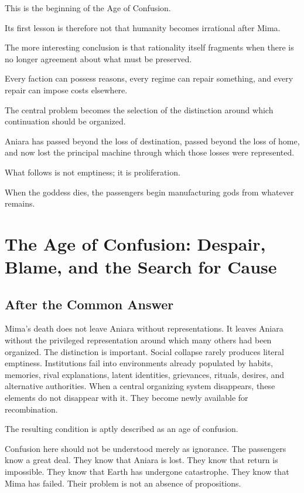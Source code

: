 \documentclass[11pt,oneside]{book}
\theoremstyle{definition}
\theoremstyle{remark}
\begin{document}
This is the beginning of the Age of Confusion.

Its first lesson is therefore not that humanity becomes irrational after Mima.

The more interesting conclusion is that rationality itself fragments when there is no longer agreement about what must be preserved.

Every faction can possess reasons, every regime can repair something, and every repair can impose costs elsewhere.

The central problem becomes the selection of the distinction around which continuation should be organized.

Aniara has passed beyond the loss of destination, passed beyond the loss of home, and now lost the principal machine through which those losses were represented.

What follows is not emptiness; it is proliferation.

When the goddess dies, the passengers begin manufacturing gods from whatever remains.

\chapter{The Age of Confusion: Despair, Blame, and the Search for Cause}

\section{After the Common Answer}

Mima's death does not leave Aniara without representations. It leaves Aniara without the privileged representation around which many others had been organized. The distinction is important. Social collapse rarely produces literal emptiness. Institutions fail into environments already populated by habits, memories, rival explanations, latent identities, grievances, rituals, desires, and alternative authorities. When a central organizing system disappears, these elements do not disappear with it. They become newly available for recombination.

The resulting condition is aptly described as an age of confusion.

Confusion here should not be understood merely as ignorance. The passengers know a great deal. They know that Aniara is lost. They know that return is impossible. They know that Earth has undergone catastrophe. They know that Mima has failed. Their problem is not an absence of propositions.
\end{document}
